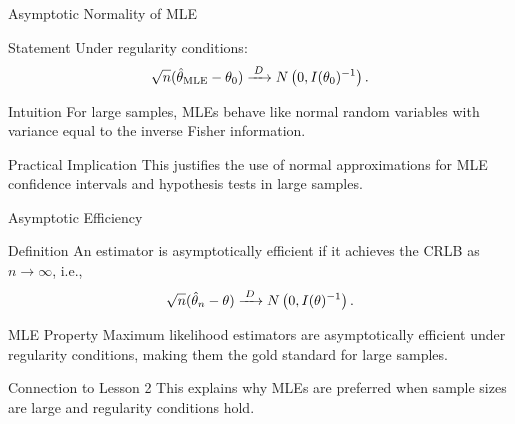 \begin{frame}{Asymptotic Normality of MLE}
  \begin{block}{Statement}
    Under regularity conditions:
    \[\sqrt{n}(\hat{\theta}_{\text{MLE}} - \theta_0) \xrightarrow{\;D\;} N\left(0, I(\theta_0)^{-1}\right).\]
  \end{block}

  \begin{block}{Intuition}
    For large samples, MLEs behave like normal random variables with
    variance equal to the inverse Fisher information.
  \end{block}

  \begin{block}{Practical Implication}
    This justifies the use of normal approximations for MLE confidence
    intervals and hypothesis tests in large samples.
  \end{block}
\end{frame}

\begin{frame}{Asymptotic Efficiency}
  \begin{block}{Definition}
    An estimator is asymptotically efficient if it achieves the CRLB
    as $n \to \infty$, i.e.,
    \[\sqrt{n}(\hat{\theta}_n - \theta) \xrightarrow{\;D\;} N\left(0, I(\theta)^{-1}\right).\]
  \end{block}

  \begin{block}{MLE Property}
    Maximum likelihood estimators are asymptotically efficient under
    regularity conditions, making them the gold standard for large samples.
  \end{block}

  \begin{block}{Connection to Lesson 2}
    This explains why MLEs are preferred when sample sizes are large
    and regularity conditions hold.
  \end{block}
\end{frame}

